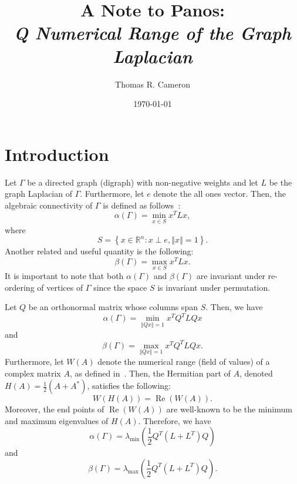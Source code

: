 \documentclass{article}
\title{A Note to Panos:\\
\emph{\large{Q Numerical Range of the Graph Laplacian}}}
\author{Thomas R. Cameron}
\date{\today}
\theoremstyle{definition}
\newcommand\norm[1]{\left\Vert#1\right\Vert}
\newcommand\re[1]{\operatorname{Re}\left(#1\right)}
\begin{document}
\maketitle
{}

\section{Introduction}	
Let $\Gamma$ be a directed graph (digraph) with non-negative weights and let $L$ be the graph Laplacian of $\Gamma$. 
Furthermore, let $e$ denote the all ones vector. 
Then, the algebraic connectivity of $\Gamma$ is defined as follows~\cite{Wu2005-1}:
\[
\alpha(\Gamma)=\min_{x\in S}x^{T}Lx,
\]
where
\[
S=\left\{x\in\mathbb{R}^{n}\colon x\perp e,\norm{x}=1\right\}.
\]
Another related and useful quantity is the following:
\[
\beta(\Gamma)=\max_{x\in S}x^{T}Lx.
\]
It is important to note that both $\alpha(\Gamma)$ and $\beta(\Gamma)$ are invariant under re-ordering of vertices of $\Gamma$ since the space $S$ is invariant under permutation.

Let $Q$ be an orthonormal matrix whose columns span $S$.
Then, we have
\[
\alpha(\Gamma)=\min_{\norm{Qx}=1}x^{T}Q^{T}LQx
\]
and
\[
\beta(\Gamma)=\max_{\norm{Qx}=1}x^{T}Q^{T}LQx.
\]
Furthermore, let $W(A)$ denote the numerical range (field of values) of a complex matrix $A$, as defined in~\cite{Horn1991}.
Then, the Hermitian part of $A$, denoted $H(A)=\frac{1}{2}(A+A^{*})$, satisfies the following:
\[
W(H(A))=\re{W(A)}.
\]
Moreover, the end points of $\re{W(A)}$ are well-known to be the minimum and maximum eigenvalues of $H(A)$. 
Therefore, we have
\begin{equation}\label{eq:alpha}
\alpha(\Gamma)=\lambda_{\text{min}}\left(\frac{1}{2}Q^{T}(L+L^{T})Q\right)
\end{equation}
and
\begin{equation}\label{eq:beta}
\beta(\Gamma)=\lambda_{\text{max}}\left(\frac{1}{2}Q^{T}(L+L^{T})Q\right).
\end{equation}

\end{document}

